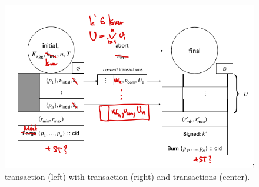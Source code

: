 \begin{figure}

  \centering

  \includegraphics[width=\textwidth/2]{figures/SM_initial_final.png}

  \caption{\mtxInit{} transaction (left) with \mtxAbort{} transaction (right)
    and \mtxCom{} transactions (center).}\label{fig:SM_initial_final}

\end{figure}



